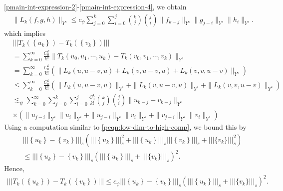 \eqref{pmain-int-expression-2}-\eqref{pmain-int-expression-4}, we obtain
%
\begin{equation*}
  \begin{split}
    & \|L_k(f, g, h)\|_{Y^s} \le c_\psi \sum_{j=0}^{k} \sum_{i=0}^{j} {k \choose
    j}{j \choose i} \|f_{k-j}\|_{Y^s} \| g_{j-i}\|_{Y^s} \| h_i \|_{Y^s}.
\end{split}
\end{equation*}
%
which implies
%
\begin{equation}
  \label{p20a}
  \begin{split}
    & | | |T_k(\left\{ u_k \right\}) - T_k(\left\{ v_k \right\}) | | |
    \\
    & = \sum_{k=0}^{\infty} \frac{C_0^k}{k!}\|T_k(u_0, u_1, \cdots, u_k) -
    T_k(v_0, v_1, \cdots, v_k) \|_{Y^s}
    \\
    & = \sum_{k=0}^{\infty} \frac{C_0^k}{k!}\left( \| L_k(u, u-v,u) +
    L_k(v,u-v,u) + L_k(v, v, u-v) \|_{Y^s} \right)
    \\
    & \le \sum_{k=0}^{\infty} \frac{C_0^k}{k!}\left( \| L_k(u, u-v,u) \|_{Y^s}
    + \|L_k(v,u-v,u)\|_{Y^s} +
    \|L_k(v, v, u-v) \|_{Y^s}\right)
    \\
    & \lesssim_{\psi} \sum_{k=0}^{\infty} \sum_{j=0}^{k}
    \sum_{i=0}^{j}\frac{C_{0}^{k}}{k!} {k \choose j } {j \choose i}
    \|u_{k-j} -v_{k-j} \|_{Y^s}
    \\
    & \times \left( \|u_{j-i}\|_{Y^s} \|u_{i}\|_{Y^s} +
    \|u_{j-i}\|_{Y^s} \| v_{i} \|_{Y^s} + \| v_{j-i} \|_{Y^s} \| v_i \|_{Y^s}  \right)
  \end{split}
\end{equation}
%
Using a computation similar to \eqref{peqn:low-dim-to-high-comp}, we bound this
by
%
%
\begin{equation*}
\begin{split}
  & | | |\left\{ u_{k} \right\} - \left\{ v_{k} \right\}| | |_{s}\left( | | |\left\{
  u_{k} \right\} | | |_{s}^{2} + | | |\left\{ u_{k} \right\} | | |_{s} | |
  | \left\{ v_k \right\} | | |_{s} + | | |\{v_{k}\} | | |_{s}^{2}
  \right)
  \\
  & \le | | |\left\{ u_{k} \right\} - \left\{ v_{k} \right\}| | |_{s}
  \left( | | |\left\{
  u_{k} \right\} | | |_{s}+ | | |\{v_{k}\} | | |_{s} \right)^2.
\end{split}
\end{equation*}
%
%
Hence,  
%
%
\begin{equation*}
\begin{split}
  | | |T_k(\left\{ u_k \right\}) - T_k(\left\{ v_k \right\}) | | |
  \le c_{\psi} | | |\left\{ u_{k} \right\} - \left\{ v_{k} \right\}| | |_{s}
  \left( | | |\left\{
  u_{k} \right\} | | |_{s}+ | | |\{v_{k}\} | | |_{s} \right)^2.
\end{split}
\end{equation*}
